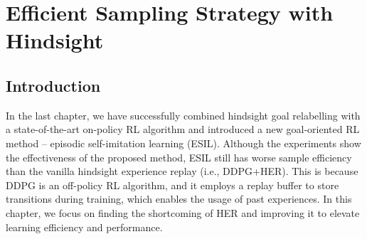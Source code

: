 \chapter{Efficient Sampling Strategy with Hindsight}
\label{ch:dtgsh}
\section{Introduction}


In the last chapter, we have successfully combined hindsight goal relabelling with a state-of-the-art on-policy RL algorithm and introduced a new goal-oriented RL method -- episodic self-imitation learning (ESIL). Although the experiments show the effectiveness of the proposed method, ESIL still has worse sample efficiency than the vanilla hindsight experience replay (i.e., DDPG+HER). This is because DDPG is an off-policy RL algorithm, and it employs a replay buffer to store transitions during training, which enables the usage of past experiences. In this chapter, we focus on finding the shortcoming of HER and improving it to elevate learning efficiency and performance.

